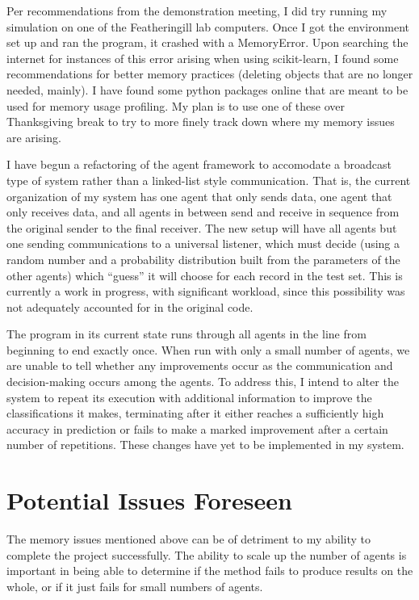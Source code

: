 \documentclass{article}
\begin{document}
Per recommendations from the demonstration meeting, I did try running my simulation on one of the Featheringill lab computers. Once I got the environment set up and ran the program, it crashed with a MemoryError. Upon searching the internet for instances of this error arising when using scikit-learn, I found some recommendations for better memory practices (deleting objects that are no longer needed, mainly). I have found some python packages online that are meant to be used for memory usage profiling. My plan is to use one of these over Thanksgiving break to try to more finely track down where my memory issues are arising.
\par
I have begun a refactoring of the agent framework to accomodate a broadcast type of system rather than a linked-list style communication. That is, the current organization of my system has one agent that only sends data, one agent that only receives data, and all agents in between send and receive in sequence from the original sender to the final receiver. The new setup will have all agents but one sending communications to a universal listener, which must decide (using a random number and a probability distribution built from the parameters of the other agents) which ``guess'' it will choose for each record in the test set. This is currently a work in progress, with significant workload, since this possibility was not adequately accounted for in the original code.
\par
The program in its current state runs through all agents in the line from beginning to end exactly once. When run with only a small number of agents, we are unable to tell whether any improvements occur as the communication and decision-making occurs among the agents. To address this, I intend to alter the system to repeat its execution with additional information to improve the classifications it makes, terminating after it either reaches a sufficiently high accuracy in prediction or fails to make a marked improvement after a certain number of repetitions. These changes have yet to be implemented in my system.

\section{Potential Issues Foreseen}
\par
The memory issues mentioned above can be of detriment to my ability to complete the project successfully. The ability to scale up the number of agents is important in being able to determine if the method fails to produce results on the whole, or if it just fails for small numbers of agents.
\end{document}
